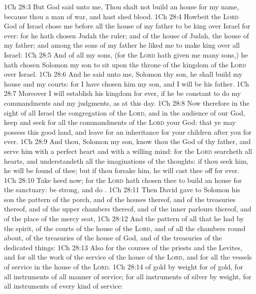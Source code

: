 \vs 1Ch 28:3 But God said unto me, Thou shalt not build an house for my name, because thou  a man of war, and hast shed blood.
\vs 1Ch 28:4 Howbeit the \textsc{Lord} God of Israel chose me before all the house of my father to be king over Israel for ever: for he hath chosen Judah  the ruler; and of the house of Judah, the house of my father; and among the sons of my father he liked me to make  king over all Israel:
\vs 1Ch 28:5 And of all my sons, (for the \textsc{Lord} hath given me many sons,) he hath chosen Solomon my son to sit upon the throne of the kingdom of the \textsc{Lord} over Israel.
\vs 1Ch 28:6 And he said unto me, Solomon thy son, he shall build my house and my courts: for I have chosen him  my son, and I will be his father.
\vs 1Ch 28:7 Moreover I will establish his kingdom for ever, if he be constant to do my commandments and my judgments, as at this day.
\vs 1Ch 28:8 Now therefore in the sight of all Israel the congregation of the \textsc{Lord}, and in the audience of our God, keep and seek for all the commandments of the \textsc{Lord} your God: that ye may possess this good land, and leave  for an inheritance for your children after you for ever.
\vs 1Ch 28:9 And thou, Solomon my son, know thou the God of thy father, and serve him with a perfect heart and with a willing mind: for the \textsc{Lord} searcheth all hearts, and understandeth all the imaginations of the thoughts: if thou seek him, he will be found of thee; but if thou forsake him, he will cast thee off for ever.
\vs 1Ch 28:10 Take heed now; for the \textsc{Lord} hath chosen thee to build an house for the sanctuary: be strong, and do .
\vs 1Ch 28:11 Then David gave to Solomon his son the pattern of the porch, and of the houses thereof, and of the treasuries thereof, and of the upper chambers thereof, and of the inner parlours thereof, and of the place of the mercy seat,
\vs 1Ch 28:12 And the pattern of all that he had by the spirit, of the courts of the house of the \textsc{Lord}, and of all the chambers round about, of the treasuries of the house of God, and of the treasuries of the dedicated things:
\vs 1Ch 28:13 Also for the courses of the priests and the Levites, and for all the work of the service of the house of the \textsc{Lord}, and for all the vessels of service in the house of the \textsc{Lord}.
\vs 1Ch 28:14  of gold by weight for  of gold, for all instruments of all manner of service;  for all instruments of silver by weight, for all instruments of every kind of service:

